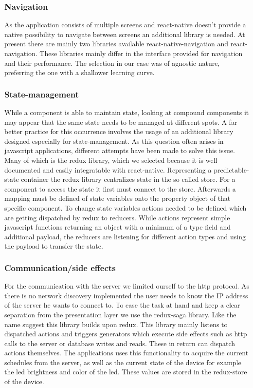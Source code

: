 \documentclass[conference]{IEEEtran}
\begin{document}

\subsubsection{Navigation}
As the application consists of multiple screens and react-native doesn't provide a native possibility to navigate between screens an
additional library is needed. At present there are mainly two libraries available react-native-navigation and react-navigation. These
libraries mainly differ in the interface provided for navigation and their performance. The selection in our case was of agnostic nature,
preferring the one with a shallower learning curve.

\subsubsection{State-management}
While a component is able to maintain state, looking at compound components it may appear that the same state needs to be managed at
different spots. A far better practice for this occurrence involves the usage of an additional library designed especially for
state-management. As this question often arises in javascript applications, different attempts have been made to solve this issue.
Many of which is the redux library, which we selected because it is well documented and easily integratable with react-native.
Representing a predictable-state container the redux library centralizes state in the so called store.
For a component to access the state it first must connect to the store. Afterwards a mapping must be defined of state variables onto the
property object of that specific component. To change state variables actions needed to be defined which are getting dispatched by redux to
reducers. While actions represent simple javascript functions returning an object with a minimum of a type field and additional payload,
the reducers are listening for different action types and using the payload to transfer the state.

\subsubsection{Communication/side effects}
For the communication with the server we limited ourself to the http protocol. As there is no network discovery implemented the user needs
to know the IP address of the server he wants to connect to. To ease the task at hand and keep a clear separation from the presentation
layer we use the redux-saga library. Like the name suggest this library builds upon redux. This library mainly listens to dispatched
actions and triggers generators which execute side effects such as http calls to the server or database writes and reads. These in
return can dispatch actions themselves.
The applications uses this functionality to acquire the current schedules from the server, as well as the current state of the device
for example the led brightness and color of the led. These values are stored in the redux-store of the device.
\end{document}
